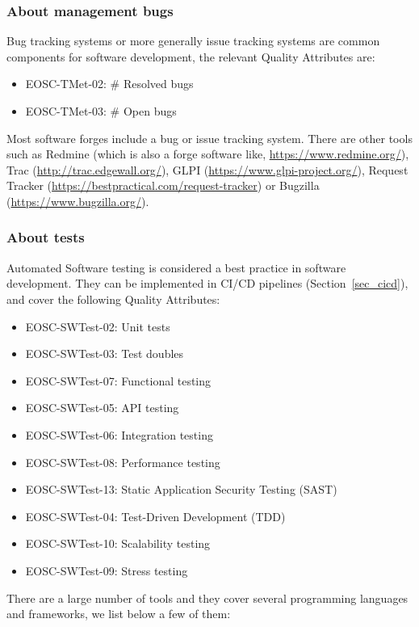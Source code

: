 \subsubsection{About management bugs}

Bug tracking systems or more generally issue tracking systems are common components for software development, the relevant Quality Attributes are:

\begin{itemize}
  \item EOSC-TMet-02: \# Resolved bugs
  \item EOSC-TMet-03: \# Open bugs
\end{itemize}

Most software forges include a bug or issue tracking system. There are other tools such as Redmine (which is also a forge software like, \url{https://www.redmine.org/}), Trac (\url{http://trac.edgewall.org/}), GLPI (\url{https://www.glpi-project.org/}), Request Tracker (\url{https://bestpractical.com/request-tracker}) or Bugzilla (\url{https://www.bugzilla.org/}).

\subsubsection{About tests}

Automated Software testing is considered a best practice in software development. They can be implemented in CI/CD pipelines (Section~\ref{sec_cicd}), and cover the following Quality Attributes:

\begin{itemize}
  \item EOSC-SWTest-02: Unit tests
  \item EOSC-SWTest-03: Test doubles
  \item EOSC-SWTest-07: Functional testing
  \item EOSC-SWTest-05: API testing
  \item EOSC-SWTest-06: Integration testing
  \item EOSC-SWTest-08: Performance testing
  \item EOSC-SWTest-13: Static Application Security Testing (SAST)
  \item EOSC-SWTest-04: Test-Driven Development (TDD)
  \item EOSC-SWTest-10: Scalability testing
  \item EOSC-SWTest-09: Stress testing
\end{itemize}

There are a large number of tools and they cover several programming languages and frameworks, we list below a few of them:

